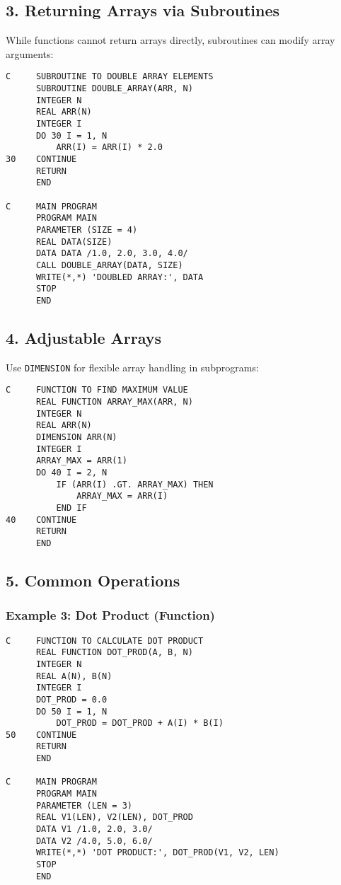 \documentclass{book}
\begin{document}
\subsection*{3. Returning Arrays via Subroutines}
While functions cannot return arrays directly, subroutines can modify array arguments:
\begin{verbatim}
C     SUBROUTINE TO DOUBLE ARRAY ELEMENTS
      SUBROUTINE DOUBLE_ARRAY(ARR, N)
      INTEGER N
      REAL ARR(N)
      INTEGER I
      DO 30 I = 1, N
          ARR(I) = ARR(I) * 2.0
30    CONTINUE
      RETURN
      END

C     MAIN PROGRAM
      PROGRAM MAIN
      PARAMETER (SIZE = 4)
      REAL DATA(SIZE)
      DATA DATA /1.0, 2.0, 3.0, 4.0/
      CALL DOUBLE_ARRAY(DATA, SIZE)
      WRITE(*,*) 'DOUBLED ARRAY:', DATA
      STOP
      END
\end{verbatim}

\subsection*{4. Adjustable Arrays}
Use \texttt{DIMENSION} for flexible array handling in subprograms:
\begin{verbatim}
C     FUNCTION TO FIND MAXIMUM VALUE
      REAL FUNCTION ARRAY_MAX(ARR, N)
      INTEGER N
      REAL ARR(N)
      DIMENSION ARR(N)
      INTEGER I
      ARRAY_MAX = ARR(1)
      DO 40 I = 2, N
          IF (ARR(I) .GT. ARRAY_MAX) THEN
              ARRAY_MAX = ARR(I)
          END IF
40    CONTINUE
      RETURN
      END
\end{verbatim}

\subsection*{5. Common Operations}
\subsubsection*{Example 3: Dot Product (Function)}
\begin{verbatim}
C     FUNCTION TO CALCULATE DOT PRODUCT
      REAL FUNCTION DOT_PROD(A, B, N)
      INTEGER N
      REAL A(N), B(N)
      INTEGER I
      DOT_PROD = 0.0
      DO 50 I = 1, N
          DOT_PROD = DOT_PROD + A(I) * B(I)
50    CONTINUE
      RETURN
      END

C     MAIN PROGRAM
      PROGRAM MAIN
      PARAMETER (LEN = 3)
      REAL V1(LEN), V2(LEN), DOT_PROD
      DATA V1 /1.0, 2.0, 3.0/
      DATA V2 /4.0, 5.0, 6.0/
      WRITE(*,*) 'DOT PRODUCT:', DOT_PROD(V1, V2, LEN)
      STOP
      END
\end{verbatim}
\end{document}
